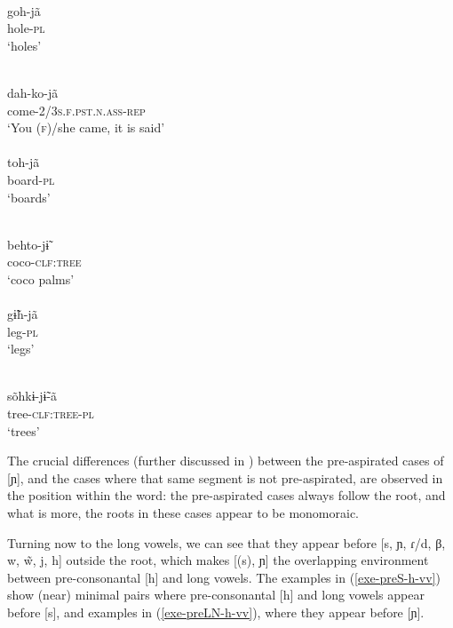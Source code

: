 \documentclass[output=paper]{langscibook}
\begin{document}
\begin{exe}
\ex\label{exe-h-enye}
\begin{xlist}
\ex
\ea 
\glll [k̰oh.ɲã]\\
goh-jã\\
hole-\textsc{pl}\\
\trans `holes'\\
{\citep[20120919elicr005]{Bruil:2012}}

\ex
\glll [t̰ah.ko.ɲã]\\
dah-ko-jã\\
come-\textsc{2/3s.f.pst.n.ass-rep}\\
\trans `You (\textsc{f})/she came, it is said'\\
{\citep[20101202slicr001.005]{Bruil:2012}}
\z
\ex
\ea \glll [toh.ɲã]\\
toh-jã\\
board-\textsc{pl}\\
\trans `boards'\\
{\citep[153]{Bruil:2014}}

\ex \glll [pḛh.to.ɲ\~ɨ]\\
behto-j\~ɨ\\
coco-\textsc{clf:tree}\\
\trans `coco palms'\\
{\citep[348]{Bruil:2014}}
\z
\ex
\ea \glll [k̰\~ɨh̃.ɲã]\\
g\~ɨh-jã\\
leg-\textsc{pl}\\
\trans `legs'\\
{\citep[20120919elicr005]{Bruil:2012}}

\ex \glll [sõh̃.kɨ.ɲ\~ɨã]\\
sõhkɨ-j\~ɨ-ã\\
tree-\textsc{clf:tree-pl}\\
\trans `trees'\\
{\citep[20120919elicr005]{Bruil:2012}}
\z
\end{xlist}
\end{exe}

The crucial differences (further discussed in ) between the pre-aspi\-rated cases of [ɲ], and the cases where that same segment is not pre-aspirated, are observed in the position within the word: the pre-aspirated cases always follow the root, and what is more, the roots in these cases appear to be monomoraic.


Turning now to the long vowels, we can see that they appear before [s, ɲ, ɾ/d, β, w, w̃, j, h] outside the root, which makes [(s), ɲ] the overlapping environment between pre-consonantal [h] and long vowels. The examples in (\ref{exe-preS-h-vv}) show (near) minimal pairs where pre-consonantal [h] and long vowels appear before [s], and examples in (\ref{exe-preLN-h-vv}), where they appear before [ɲ].
\end{document}
